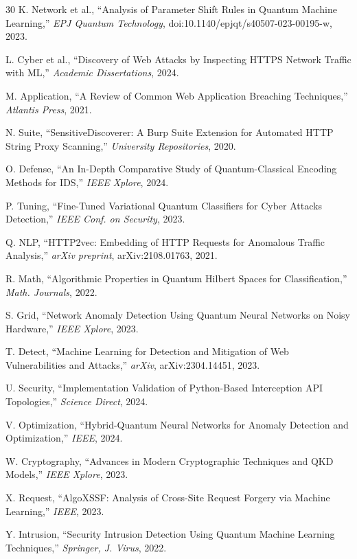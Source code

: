 \documentclass[journal,onecolumn]{IEEEtran}
\begin{document}
\begin{thebibliography}{30}
K. Network et al., ``Analysis of Parameter Shift Rules in Quantum Machine Learning,'' \textit{EPJ Quantum Technology}, doi:10.1140/epjqt/s40507-023-00195-w, 2023.

L. Cyber et al., ``Discovery of Web Attacks by Inspecting HTTPS Network Traffic with ML,'' \textit{Academic Dissertations}, 2024.

M. Application, ``A Review of Common Web Application Breaching Techniques,'' \textit{Atlantis Press}, 2021.

N. Suite, ``SensitiveDiscoverer: A Burp Suite Extension for Automated HTTP String Proxy Scanning,'' \textit{University Repositories}, 2020.

O. Defense, ``An In-Depth Comparative Study of Quantum-Classical Encoding Methods for IDS,'' \textit{IEEE Xplore}, 2024.

P. Tuning, ``Fine-Tuned Variational Quantum Classifiers for Cyber Attacks Detection,'' \textit{IEEE Conf. on Security}, 2023.

Q. NLP, ``HTTP2vec: Embedding of HTTP Requests for Anomalous Traffic Analysis,'' \textit{arXiv preprint}, arXiv:2108.01763, 2021.

R. Math, ``Algorithmic Properties in Quantum Hilbert Spaces for Classification,'' \textit{Math. Journals}, 2022.

S. Grid, ``Network Anomaly Detection Using Quantum Neural Networks on Noisy Hardware,'' \textit{IEEE Xplore}, 2023.

T. Detect, ``Machine Learning for Detection and Mitigation of Web Vulnerabilities and Attacks,'' \textit{arXiv}, arXiv:2304.14451, 2023.

U. Security, ``Implementation Validation of Python-Based Interception API Topologies,'' \textit{Science Direct}, 2024.

V. Optimization, ``Hybrid-Quantum Neural Networks for Anomaly Detection and Optimization,'' \textit{IEEE}, 2024.

W. Cryptography, ``Advances in Modern Cryptographic Techniques and QKD Models,'' \textit{IEEE Xplore}, 2023.

X. Request, ``AlgoXSSF: Analysis of Cross-Site Request Forgery via Machine Learning,'' \textit{IEEE}, 2023.

Y. Intrusion, ``Security Intrusion Detection Using Quantum Machine Learning Techniques,'' \textit{Springer, J. Virus}, 2022.


\end{thebibliography}
\end{document}
